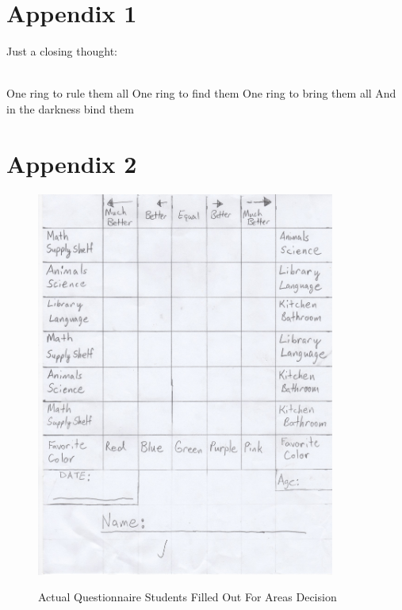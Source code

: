 \documentclass[11pt]{article}
\begin{document}



 \section{Appendix 1}
 Just a closing thought:

 \tengwarannataritalic[1.25]
 \Textendedcalma\TTthreedots\Tnuumen\Tessenuquerna\TTthreedots\Tungwe\Tando\Toore\TTrightcurl\Tumbar\Ttinco\TTthreedots\Tlambealt\TTrightcurl\Tquesse\TTdoublerightcurl
 \Tromanperiod\Ts
 \Textendedcalma\TTthreedots\Tnuumen\Tessenuquerna\TTthreedots\Tungwe\Tungwe\Tumbar\TTnasalizer\TTdot\Ttinco\TTthreedots\Tlambe\TTrightcurl
 \\
 \Textendedcalma\TTthreedots\Tnuumen\Tessenuquerna\TTthreedots\Tungwe\Tthuule\Troomen\Tquesse\TTthreedots\Ttinco\TTthreedots\Tlambealt\TTrightcurl\Tquesse\TTdoublerightcurl
 \Tromanperiod\Ts
 \Textendedungwe\TTthreedots\Tumbar\Toore\TTrightcurl\Tesse{}\Tmalta\TTrightcurl\Textendedcalma\TTdot\Ttelco\TTdot\Tquesse\Troomen\Tparma\TTnasalizer\TTdot\Ttinco\TTthreedots\Tlambe\TTrightcurl
 \newline
 One ring to rule them all \newline
 One ring to find them \newline
 One ring to bring them all \newline
 And in the darkness bind them


\section{Appendix 2}
\begin{figure}[!hb]
\caption{Actual Questionnaire Students Filled Out For Areas Decision}
\includegraphics[height=5in]{SampleAHPQuestionnaire}
\label{fig:2}
\end{figure}
\end{document}
